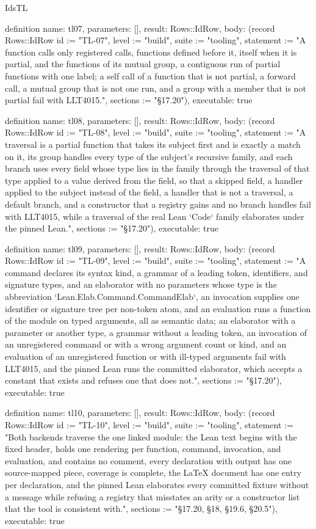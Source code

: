 \begin{lexlean}{IdsTL}
\begin{semanticmodule}
definition{
  name: tl07,
  parameters: [],
  result: Rows::IdRow,
  body: (record Rows::IdRow {id := "TL-07", level := "build", suite := "tooling", statement := "A function calls only registered calls, functions defined before it, itself when it is partial, and the functions of its mutual group, a contiguous run of partial functions with one label; a self call of a function that is not partial, a forward call, a mutual group that is not one run, and a group with a member that is not partial fail with LLT4015.", sections := "§17.20"}),
  executable: true
}

definition{
  name: tl08,
  parameters: [],
  result: Rows::IdRow,
  body: (record Rows::IdRow {id := "TL-08", level := "build", suite := "tooling", statement := "A traversal is a partial function that takes its subject first and is exactly a match on it, its group handles every type of the subject's recursive family, and each branch uses every field whose type lies in the family through the traversal of that type applied to a value derived from the field, so that a skipped field, a handler applied to the subject instead of the field, a handler that is not a traversal, a default branch, and a constructor that a registry gains and no branch handles fail with LLT4015, while a traversal of the real Lean `Code` family elaborates under the pinned Lean.", sections := "§17.20"}),
  executable: true
}

definition{
  name: tl09,
  parameters: [],
  result: Rows::IdRow,
  body: (record Rows::IdRow {id := "TL-09", level := "build", suite := "tooling", statement := "A command declares its syntax kind, a grammar of a leading token, identifiers, and signature types, and an elaborator with no parameters whose type is the abbreviation `Lean.Elab.Command.CommandElab`, an invocation supplies one identifier or signature tree per non-token atom, and an evaluation runs a function of the module on typed arguments, all as semantic data; an elaborator with a parameter or another type, a grammar without a leading token, an invocation of an unregistered command or with a wrong argument count or kind, and an evaluation of an unregistered function or with ill-typed arguments fail with LLT4015, and the pinned Lean runs the committed elaborator, which accepts a constant that exists and refuses one that does not.", sections := "§17.20"}),
  executable: true
}

definition{
  name: tl10,
  parameters: [],
  result: Rows::IdRow,
  body: (record Rows::IdRow {id := "TL-10", level := "build", suite := "tooling", statement := "Both backends traverse the one linked module: the Lean text begins with the fixed header, holds one rendering per function, command, invocation, and evaluation, and contains no comment, every declaration with output has one source-mapped piece, coverage is complete, the LaTeX document has one entry per declaration, and the pinned Lean elaborates every committed fixture without a message while refusing a registry that misstates an arity or a constructor list that the tool is consistent with.", sections := "§17.20, §18, §19.6, §20.5"}),
  executable: true
}


\end{semanticmodule}
\end{lexlean}
